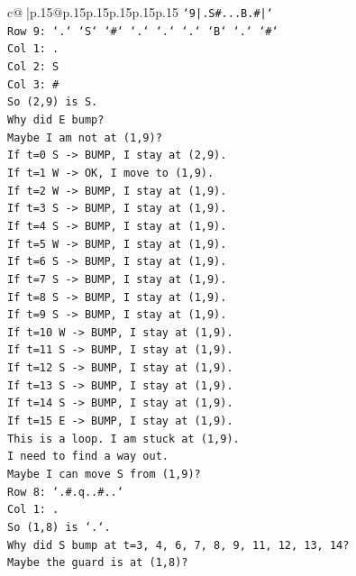 \documentclass{article}
\begin{document}
{\begin{supertabular}{c@{$\;$}|p{.15\linewidth}@{}p{.15\linewidth}p{.15\linewidth}p{.15\linewidth}p{.15\linewidth}p{.15\linewidth}}
{{{\texttt{`9|.S\#...B.\#|`} \\
\texttt{Row 9: `.` `S` `\#` `.` `.` `.` `B` `.` `\#`} \\
\texttt{Col 1: .} \\
\texttt{Col 2: S} \\
\texttt{Col 3: \#} \\
\texttt{So (2,9) is S.} \\
\texttt{Why did E bump?} \\
\texttt{Maybe I am not at (1,9)?} \\
\texttt{If t=0 S {-}> BUMP, I stay at (2,9).} \\
\texttt{If t=1 W {-}> OK, I move to (1,9).} \\
\texttt{If t=2 W {-}> BUMP, I stay at (1,9).} \\
\texttt{If t=3 S {-}> BUMP, I stay at (1,9).} \\
\texttt{If t=4 S {-}> BUMP, I stay at (1,9).} \\
\texttt{If t=5 W {-}> BUMP, I stay at (1,9).} \\
\texttt{If t=6 S {-}> BUMP, I stay at (1,9).} \\
\texttt{If t=7 S {-}> BUMP, I stay at (1,9).} \\
\texttt{If t=8 S {-}> BUMP, I stay at (1,9).} \\
\texttt{If t=9 S {-}> BUMP, I stay at (1,9).} \\
\texttt{If t=10 W {-}> BUMP, I stay at (1,9).} \\
\texttt{If t=11 S {-}> BUMP, I stay at (1,9).} \\
\texttt{If t=12 S {-}> BUMP, I stay at (1,9).} \\
\texttt{If t=13 S {-}> BUMP, I stay at (1,9).} \\
\texttt{If t=14 S {-}> BUMP, I stay at (1,9).} \\
\texttt{If t=15 E {-}> BUMP, I stay at (1,9).} \\
\texttt{This is a loop. I am stuck at (1,9).} \\
\texttt{I need to find a way out.} \\
\texttt{Maybe I can move S from (1,9)?} \\
\texttt{Row 8: `.\#.q..\#..`} \\
\texttt{Col 1: .} \\
\texttt{So (1,8) is `.`.} \\
\texttt{Why did S bump at t=3, 4, 6, 7, 8, 9, 11, 12, 13, 14?} \\
\texttt{Maybe the guard is at (1,8)?} \\
}}}
\end{supertabular}}
\end{document}
